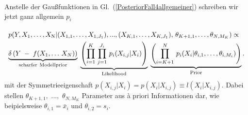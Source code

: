 Anstelle der Gaußfunktionen in Gl.~(\ref{PosteriorFall4allgemeiner}) schreiben wir jetzt
ganz allgemein $p_i$
\begin{equation}
\arraycolsep=2.0pt\def\arraystretch{2.0}
\begin{array}{l}
p(Y, X_\mathrm{1}, \dots, X_\mathrm{N} | (X_{1,1}, \dots, X_{1,J_1}), ..., (X_{K,1}, \dots, X_{K,J_1}), \,
 \theta_{K+1,1}, \dots, \theta_{N,M_K}) \propto \\
\underbrace{\delta\left(Y \; - \; f(X_1, \dots \, X_N)\right)}_{\mathrm{scharfer~Modellprior}}
\; \underbrace{ \left( \prod\limits_{i=1}^K \, \prod\limits_{j=1}^{J_i}  \, p_i (X_{i,j} | X_i) \right) }_{\mathrm{Likelihood}}
\; \underbrace{ \left( \prod\limits_{i=K+1}^N \,  p_i (X_i | \theta_{i,1}, \dots, \theta_{i,M_i}) \right) }_{\mathrm{Prior}} .
\end{array}
\label{PosteriorFall4p}
\end{equation}
mit der Symmetrieeigenschaft $p(X_{i,j} | X_i) = p(X_i | X_{i,j}) \equiv l(X_i | X_{i,j})$.
Dabei stellen $\theta_{K+1,1},$ $\dots,$ $\theta_{N,M_K}$ Parameter aus {\`a} priori Informationen dar,
wie beipielsweise $\theta_{i,1} = \bar x_i$ und $\theta_{i,2} = s_i$.

